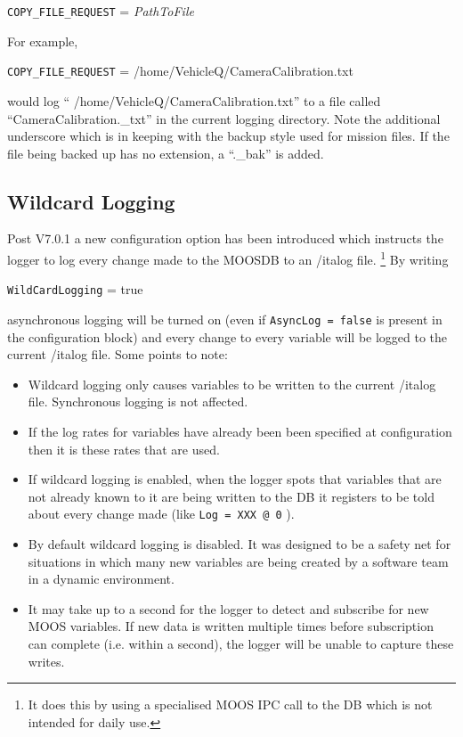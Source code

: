 \documentclass[a4paper,10pt]{article}
\newcommand{\Code}[1]{\texttt{#1} }
\newcommand{\code}[1]{\Code{#1} }
\begin{document}
\begin{center}
\code{COPY\_FILE\_REQUEST} =  \textit{PathToFile}
\end{center}

For example,

\begin{center}
\code{COPY\_FILE\_REQUEST} =  /home/VehicleQ/CameraCalibration.txt
\end{center}

would log `` /home/VehicleQ/CameraCalibration.txt'' to a file called ``CameraCalibration.\_txt'' in the current logging directory. Note the additional underscore which is in keeping with the backup style used for mission files. If the file being backed up has no extension, a ``.\_bak'' is added.

\subsection{Wildcard Logging}

Post V7.0.1 a new configuration option has been introduced which instructs the logger to log every change made to the MOOSDB to an {/it{alog}} file. \footnote{It does this by using a specialised MOOS IPC call to the DB which is not intended for daily use.} By writing

\begin{center}
\code{WildCardLogging} =  true
\end{center}

asynchronous logging will be turned on (even if \code{AsyncLog = false} is present in the configuration block) and every change to every variable will be logged to the current {/it{alog}} file. Some points to note:

\begin{itemize}
\item Wildcard logging only causes variables to be written to the current {/it{alog}} file. Synchronous logging is not affected.
\item If the log rates for variables have already been been specified at configuration then it is these rates that are used.
\item If wildcard logging is enabled, when the logger spots that variables that are not already known to it are being written to the DB it registers to be told about every change made (like \code{Log = XXX @ 0}).
\item By default wildcard logging is disabled. It was designed to be a safety net for situations in which many new variables are being created by a software team in a dynamic environment.
\item It may take up to a second for the logger to detect and subscribe for new MOOS variables. If new data is written multiple times before subscription can complete (i.e. within a second), the logger will be unable to capture these writes.
\end{itemize}
\end{document}
